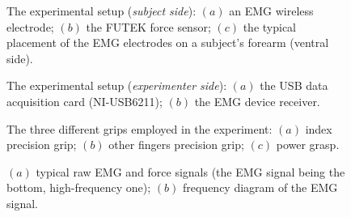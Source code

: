 \documentclass[10pt]{bmc_article}
\def\texttt{[image: ]}
\newenvironment{bmcformat}{\begin{raggedright}\baselineskip20pt\sloppy\setboolean{publ}{false}}{\end{raggedright}\baselineskip20pt\sloppy}
\begin{document}
\begin{bmcformat}
\begin{figure}[!ht] \centering
  \caption{The experimental setup (\textit{subject side}): $(a)$ an EMG
    wireless electrode; $(b)$ the FUTEK force sensor; $(c)$ the typical
    placement of the EMG electrodes on a subject's forearm (ventral side).}
  \label{fig:SubjSetup}
\end{figure}

\begin{figure}[!ht] \centering
  \caption{The experimental setup (\textit{experimenter side}): $(a)$
   the USB data acquisition card (NI-USB6211); $(b)$ the EMG device
   receiver.}
  \label{fig:ExpSetup}
\end{figure}

\begin{figure}[!t] \centering
  \caption{The three different grips employed in the experiment: $(a)$
   index precision grip; $(b)$ other fingers precision grip; $(c)$
   power grasp.}
  \label{fig:Grasps}
\end{figure}

\begin{figure}[!ht] \centering
  \caption{$(a)$ typical raw EMG and force signals (the EMG signal
    being the bottom, high-frequency one); $(b)$ frequency diagram of
    the EMG signal.}
  \label{fig:spectra}
\end{figure}


\end{bmcformat}
\end{document}
